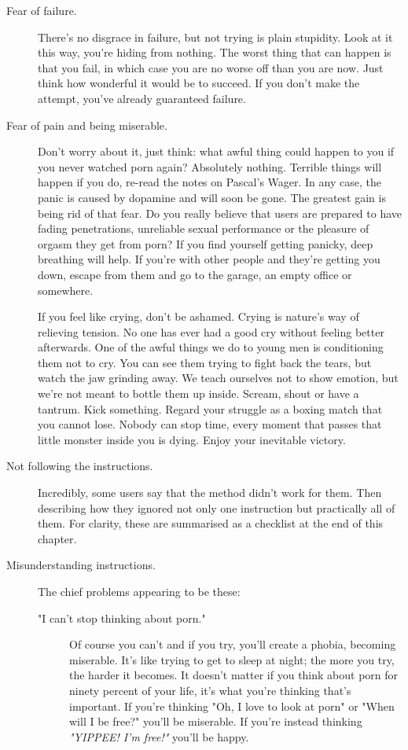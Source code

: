 \documentclass[easypeasy.tex]{subfiles}
\begin{document}
\begin{description}
  \item [Fear of failure.] There's no disgrace in failure, but not trying is plain stupidity. Look at it this way, you're hiding from nothing. The worst thing that can happen is that you fail, in which case you are no worse off than you are now. Just think how wonderful it would be to succeed. If you don't make the attempt, you've already guaranteed failure.

  \item [Fear of pain and being miserable.] Don't worry about it, just think: what awful thing could happen to you if you never watched porn again? Absolutely nothing. Terrible things will happen if you do, re-read the notes on Pascal's Wager. In any case, the panic is caused by dopamine and will soon be gone. The greatest gain is being rid of that fear. Do you really believe that users are prepared to have fading penetrations, unreliable sexual performance or the pleasure of orgasm they get from porn? If you find yourself getting panicky, deep breathing will help. If you're with other people and they're getting you down, escape from them and go to the garage, an empty office or somewhere.

  If you feel like crying, don't be ashamed. Crying is nature's way of relieving tension. No one has ever had a good cry without feeling better afterwards. One of the awful things we do to young men is conditioning them not to cry. You can see them trying to fight back the tears, but watch the jaw grinding away. We teach ourselves not to show emotion, but we're not meant to bottle them up inside. Scream, shout or have a tantrum. Kick something. Regard your struggle as a boxing match that you cannot lose. Nobody can stop time, every moment that passes that little monster inside you is dying. Enjoy your inevitable victory. 

  \item [Not following the instructions.] Incredibly, some users say that the method didn't work for them. Then describing how they ignored not only one instruction but practically all of them. For clarity, these are summarised as a checklist at the end of this chapter.

  \item [Misunderstanding instructions.] The chief problems appearing to be these:

    \begin{description} 
    \item["I can't stop thinking about porn."]
      Of course you can't and if you try, you'll create a phobia, becoming miserable. It's like trying to get to sleep at night; the more you try, the harder it becomes. It doesn't matter if you think about porn for ninety percent of your life, it's what you're thinking that's important. If you're thinking "Oh, I love to look at porn" or "When will I be free?" you'll be miserable. If you're instead thinking \textit{"YIPPEE! I'm free!"} you'll be happy.


\end{description}
\end{description}
\end{document}

